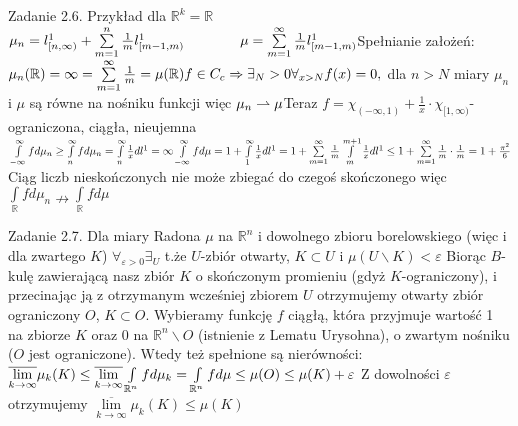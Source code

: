 \documentclass{article}
\begin{document}
Zadanie 2.6.
\newline
\newline
Przykład dla $\mathbb{R}^k=\mathbb{R}$\newline
$
\mu_n=l^1_{[n,\infty)}+\sum\limits_{m=1}^{n}\frac{1}{m}l^1_{[m-1,m)}\quad\quad\quad\quad
\mu=\sum\limits_{m=1}^{\infty}\frac{1}{m}l^1_{[m-1,m)}\newline
$Spełnianie założeń:\newline
$
\mu_n(\mathbb{R})=\infty=\sum\limits_{m=1}^{\infty}\frac{1}{m}=\mu(\mathbb{R})\newline
f\in C_c\Rightarrow\exists_N>0\forall_{x>N}f(x)=0,$ dla $n>N$ miary $\mu_n$ i $\mu$ są równe na nośniku funkcji więc $\mu_n\rightharpoonup\mu\newline
$Teraz $f=\chi_{(-\infty,1)}+\frac{1}{x}\cdot\chi_{[1,\infty)}$-ograniczona, ciągła, nieujemna$\newline
\int\limits_{-\infty}^{\infty}fd\mu_n\ge\int\limits_{n}^{\infty}fd\mu_n=\int\limits_{n}^{\infty}\frac{1}{x}dl^1=\infty\newline
\int\limits_{-\infty}^{\infty}fd\mu=1+\int\limits_{1}^{\infty}\frac{1}{x}dl^1=1+\sum\limits_{m=1}^{\infty}\frac{1}{m}\int\limits_{m}^{m+1}\frac{1}{x}dl^1\le
1+\sum\limits_{m=1}^{\infty}\frac{1}{m}\cdot\frac{1}{m}=1+\frac{\pi^2}{6}$\newline
Ciąg liczb nieskończonych nie może zbiegać do czegoś skończonego więc $\int\limits_{\mathbb{R}}fd\mu_n\nrightarrow\int\limits_{\mathbb{R}}fd\mu$\newline\newline\newline\newline


Zadanie 2.7.
\newline
\newline
Dla miary Radona $\mu$ na $\mathbb{R}^n$ i dowolnego zbioru borelowskiego (więc i dla zwartego $K$)\newline
$\forall_{\varepsilon>0}\exists_U$ t.że $U$-zbiór otwarty, $K\subset U$ i $\mu(U\backslash K)<\varepsilon$\newline
Biorąc $B$-kulę zawierającą nasz zbiór $K$ o skończonym promieniu (gdyż $K$-ograniczony), i przecinając ją z otrzymanym wcześniej zbiorem $U$
otrzymujemy otwarty zbiór ograniczony $O$, $K\subset O$.\newline
Wybieramy funkcję $f$ ciągłą, która przyjmuje wartość 1 na zbiorze $K$ oraz 0 na $\mathbb{R}^n\backslash O$ (istnienie z Lematu Urysohna),
o zwartym nośniku ($O$ jest ograniczone). Wtedy też spełnione są nierówności:\newline
$
\overline{\lim\limits_{k\rightarrow\infty}}\mu_k(K)\le\overline{\lim\limits_{k\rightarrow\infty}}\int\limits_{\mathbb{R}^n}fd\mu_k=
\int\limits_{\mathbb{R}^n}fd\mu\le\mu(O)\le\mu(K)+\varepsilon\newline
$
Z dowolności $\varepsilon$ otrzymujemy $\overline{\lim\limits_{k\rightarrow\infty}}\mu_k(K)\le\mu(K)$\newline\newline\newline\newline
\end{document}
